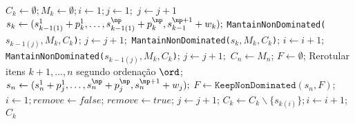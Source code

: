 \begin{algorithmic}[1] %
    \State $C_k \gets \emptyset; M_k \gets \emptyset; i \gets 1; j \gets 1;$
      \State $j \gets j + 1$
    \EndWhile
      \State $s_k \gets (s_{k-1(1)}^1 + p_k^1,
        \ldots,
        s_{k-1(1)}^{\np} + p_k^{\np},
        s_{k-1}^{\np+1} + w_k);$
        \State \texttt{MantainNonDominated($s_{k-1(j)}, M_k, C_k$)}; $j \gets j + 1;$
      \EndWhile
      \State \texttt{MantainNonDominated($s_k, M_k, C_k$)}; $i \gets i + 1;$
    \EndWhile
      \State \texttt{MantainNonDominated($s_{k-1(j)}, M_k, C_k$)}; $j \gets j + 1;$
    \EndWhile
      \State $C_n \gets M_n$;
    \Else
      \State $F \gets \emptyset$;
          \State Rerotular itens $k+1, \ldots, n$ segundo ordenação $\ord$;
              \State $s_n \gets (s_n^1 + p_j^1, \ldots, s_n^{\np} + p_j^{\np}, s_n^{\np+1} + w_j);$
            \EndIf
          \EndFor
          \State $F \gets \texttt{KeepNonDominated}(s_n, F)$;
        \EndFor
      \EndFor
      \State $i \gets 1; remove \gets false$;
    \EndIf
        \State $remove \gets true$;
      \Else
        \State $j \gets j + 1$;
      \EndIf
    \EndWhile
      \State $C_k \gets C_k\backslash \{s_{k(i)}\}; i \gets i + 1$;
    \EndIf
  \State \Return $C_k$
  \EndFunction
\end{algorithmic}
